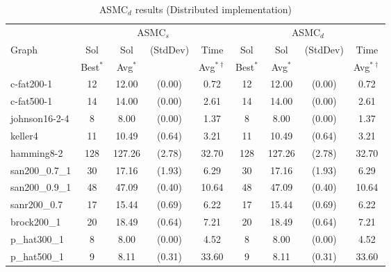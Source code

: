 \documentclass[11pt]{article}
\begin{document}
\begin{table}[ht!]
\caption{ASMC$_d$ results (Distributed implementation)\label{tab:distributed1}}
\begin{footnotesize}
\begin{center}
\begin{tabular}{|l||c|cc|c||c|cc|c|}
\hline
& \multicolumn{4}{|c||}{ASMC$_s$} & \multicolumn{4}{|c|}{ASMC$_d$}\\
Graph 	        & Sol      & Sol   & (StdDev)   & Time  	   & Sol      &Sol   & (StdDev)   & Time  	           \\ 
                & Best$^*$ &  Avg$^*$   &  	    &Avg$^{*\dag}$   & Best$^*$  &  Avg$^*$   &  	    &Avg$^{*\dag}$       \\  
\hline				       		                                    				       
c-fat200-1 	    & 12       & 12.00     & (0.00) 	& 0.72         & 12 		& 12.00     & (0.00) 	& 0.72         \\
c-fat500-1      & 14       & 14.00     & (0.00)    & 2.61         & 14         & 14.00     & (0.00)    & 2.61         \\
\hline                                                              
johnson16-2-4   & 8        & 8.00 		& (0.00) 	& 1.37         & 8 	        & 8.00 		& (0.00) 	& 1.37          \\
\hline                                                              
keller4 	    & 11       & 10.49 	& (0.64) 	& 3.21         & 11 		& 10.49 	& (0.64) 	& 3.21         \\
\hline                                                                                                            
hamming8-2 	    & 128      & 127.26 	& (2.78) 	& 32.70        & 128 	 	& 127.26 	& (2.78) 	& 32.70        \\
\hline                                                                                                            
san200\_0.7\_1 	& 30       & 17.16 	& (1.93) 	& 6.29         & 30 		& 17.16 	& (1.93) 	& 6.29         \\
san200\_0.9\_1 	& 48       & 47.09 	& (0.40) 	& 10.64        & 48 		& 47.09 	& (0.40) 	& 10.64         \\
\hline                                                                                                            
sanr200\_0.7 	& 17       & 15.44 	& (0.69) 	& 6.22         & 17 		& 15.44 	& (0.69) 	& 6.22         \\
\hline                                                                                                            
brock200\_1 	& 20       & 18.49 	& (0.64) 	& 7.21         & 20 		& 18.49 	& (0.64) 	& 7.21         \\
\hline                                                                                                            
p\_hat300\_1 	& 8        & 8.00 		& (0.00) 	& 4.52         & 8 	        & 8.00 		& (0.00) 	& 4.52         \\
p\_hat500\_1 	& 9        & 8.11 		& (0.31) 	& 33.60        & 9 	        & 8.11 		& (0.31) 	& 33.60        \\





\end{tabular}
\end{center}
\end{footnotesize}
\end{table}
\end{document}
